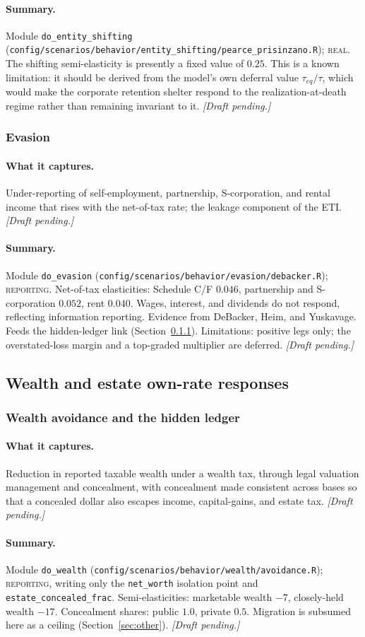 \documentclass[11pt]{article}
\newcommand{\code}[1]{\texttt{\small #1}}
\newcommand{\pending}{\textit{[Draft pending.]}}
\newcommand{\field}[1]{\paragraph{#1.}}
\begin{document}
\field{Summary}
Module \code{do_entity_shifting}
(\code{config/scenarios/behavior/entity_shifting/pearce_prisinzano.R});
\textsc{real}. The shifting semi-elasticity is presently a fixed value of
$0.25$. This is a known limitation: it should be derived from the model's own
deferral value $\tau_{eq}/\tau$, which would make the corporate retention shelter
respond to the realization-at-death regime rather than remaining invariant to
it. \pending

\subsubsection{Evasion}
\label{sec:evasion}

\field{What it captures}
Under-reporting of self-employment, partnership, S-corporation, and rental
income that rises with the net-of-tax rate; the leakage component of the ETI.
\pending

\field{Summary}
Module \code{do_evasion} (\code{config/scenarios/behavior/evasion/debacker.R});
\textsc{reporting}. Net-of-tax elasticities: Schedule C/F $0.046$, partnership
and S-corporation $0.052$, rent $0.040$. Wages, interest, and dividends do not
respond, reflecting information reporting. Evidence from DeBacker, Heim, and
Yuskavage. Feeds the hidden-ledger link (Section~\ref{sec:avoidance}).
Limitations: positive legs only; the overstated-loss margin and a top-graded
multiplier are deferred. \pending

\subsection{Wealth and estate own-rate responses}

\subsubsection{Wealth avoidance and the hidden ledger}
\label{sec:avoidance}

\field{What it captures}
Reduction in reported taxable wealth under a wealth tax, through legal valuation
management and concealment, with concealment made consistent across bases so
that a concealed dollar also escapes income, capital-gains, and estate tax.
\pending

\field{Summary}
Module \code{do_wealth} (\code{config/scenarios/behavior/wealth/avoidance.R});
\textsc{reporting}, writing only the \code{net_worth} isolation point and
\code{estate_concealed_frac}. Semi-elasticities: marketable wealth $-7$,
closely-held wealth $-17$. Concealment shares: public $1.0$, private $0.5$.
Migration is subsumed here as a ceiling (Section~\ref{sec:other}). \pending
\end{document}
